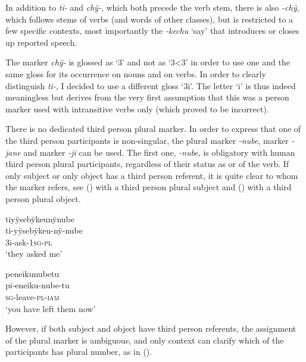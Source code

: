 In addition to \textit{ti-} and \textit{chÿ-}, which both precede the verb stem, there is also \textit{-chÿ}, which follows stems of verbs (and words of other classes), but is restricted to a few specific contexts, most importantly the  \textit{-kechu} ‘say’ that introduces or closes up reported speech.

The marker \textit{chÿ-} is glossed as ‘3’ and not as ‘3<3’ in order to use one and the same gloss for its occurrence on nouns and on verbs. In order to clearly distinguish \textit{ti-}, I decided to use a different gloss ‘3i’. The letter ‘i’ is thus indeed meaningless but derives from the very first assumption that this was a person marker used with intransitive verbs only (which proved to be incorrect).

There is no dedicated third person plural marker. In order to express that one of the third person participants is non-singular, the plural marker \textit{-nube},  marker \-\textit{-jane} and  marker \textit{-ji} can be used. The first one, \textit{-nube}, is obligatory with human third person plural participants, regardless of their status as  or  of the verb. If only subject or only object has a third person referent, it is quite clear to whom the marker refers, see () with a third person plural subject and () with a third person plural object. 

\ea\label{ex:Sketch-3PLSUBJ}
\begingl
\glpreamble tiyÿsebÿkeunÿnube\\
\gla ti-yÿsebÿkeu-nÿ-nube\\
\glb 3i-ask-1\textsc{sg}-\textsc{pl}\\
\glft ‘they asked me’\\
\endgl
\xe

\ea\label{ex:Sketch-3PLOBJ}
\begingl
\glpreamble peneikunubetu\\
\gla pi-eneiku-nube-tu\\
\textsc{sg}-leave-\textsc{pl}-\textsc{iam}\\
\glft ‘you have left them now’\\
\endgl
\xe


However, if both subject and object have third person referents, the assignment of the plural marker is ambiguous, and only context can clarify which of the participants has plural number, as in ().

